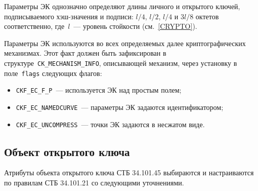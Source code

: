Параметры ЭК однозначно определяют длины личного и открытого ключей, 
подписываемого хэш-значения и подписи: $l/4$, $l/2$, $l/4$ и $3l/8$ 
октетов соответственно, где~$l$~--- уровень стойкости (см.~\ref{CRYPTO}). 

Параметры ЭК используются во всех определяемых далее криптографических 
механизмах. Этот факт должен быть зафиксирован в 
структуре~\verb|CK_MECHANISM_INFO|, описывающей механизм,  
через установку в поле~\texttt{flags} следующих флагов:
\begin{itemize}
\item
\verb|CKF_EC_F_P|~--- используется ЭК над простым полем;
\item
\verb|CKF_EC_NAMEDCURVE|~--- параметры ЭК задаются идентификатором;
\item
\verb|CKF_EC_UNCOMPRESS|~--- точки ЭК задаются в несжатом виде.
\end{itemize}

\subsection{Объект открытого ключа}\label{CRYPTOKI.Pubkey}

Атрибуты объекта открытого ключа СТБ 34.101.45 
выбираются и настраиваются по правилам СТБ 34.101.21 со 
следующими уточнениями.

